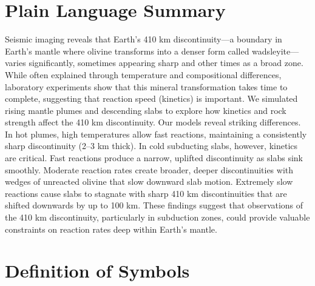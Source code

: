 \documentclass[draft,linenumbers]{agujournal2019}
\begin{document}
\section*{Plain Language Summary}
Seismic imaging reveals that Earth's 410 km discontinuity---a boundary
in Earth's mantle where olivine transforms into a denser form called
wadsleyite---varies significantly, sometimes appearing sharp and other
times as a broad zone. While often explained through temperature and
compositional differences, laboratory experiments show that this mineral
transformation takes time to complete, suggesting that reaction speed
(kinetics) is important. We simulated rising mantle plumes and
descending slabs to explore how kinetics and rock strength affect the
410 km discontinuity. Our models reveal striking differences. In hot
plumes, high temperatures allow fast reactions, maintaining a
consistently sharp discontinuity (2--3 km thick). In cold subducting
slabs, however, kinetics are critical. Fast reactions produce a narrow,
uplifted discontinuity as slabs sink smoothly. Moderate reaction rates
create broader, deeper discontinuities with wedges of unreacted olivine
that slow downward slab motion. Extremely slow reactions cause slabs to
stagnate with sharp 410 km discontinuities that are shifted downwards by
up to 100 km. These findings suggest that observations of the 410 km
discontinuity, particularly in subduction zones, could provide valuable
constraints on reaction rates deep within Earth's mantle.

\clearpage

\section*{Definition of Symbols}\label{sec:symbols}
\end{document}
